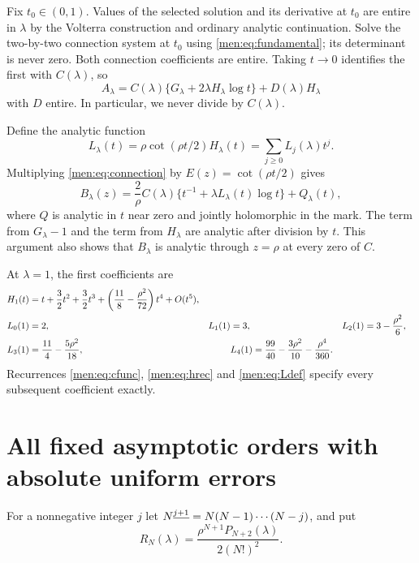 \documentclass[11pt,letterpaper]{article}
\theoremstyle{remark}\newtheorem{remark}[theorem]{Remark}
\begin{document}
Fix $t_0\in(0,1)$. Values of the selected solution and its derivative at $t_0$ are entire in $\lambda$ by the Volterra construction and ordinary analytic continuation. Solve the two-by-two connection system at $t_0$ using \eqref{men:eq:fundamental}; its determinant is never zero. Both connection coefficients are entire. Taking $t\to0$ identifies the first with $C(\lambda)$, so
\begin{equation}\label{men:eq:connection}
 A_\lambda=C(\lambda)\{G_\lambda+2\lambda H_\lambda\log t\}
                   +D(\lambda)H_\lambda
\end{equation}
with $D$ entire. In particular, we never divide by $C(\lambda)$.

Define the analytic function
\begin{equation}\label{men:eq:Ldef}
 L_\lambda(t)=\rho\cot(\rho t/2)H_\lambda(t)
            =\sum_{j\ge0}L_j(\lambda)t^j.
\end{equation}
Multiplying \eqref{men:eq:connection} by $E(z)=\cot(\rho t/2)$ gives
\begin{equation}\label{men:eq:localsingular}
 B_\lambda(z)=\frac2\rho C(\lambda)
     \{t^{-1}+\lambda L_\lambda(t)\log t\}+Q_\lambda(t),
\end{equation}
where $Q$ is analytic in $t$ near zero and jointly holomorphic in the mark. The term from $G_\lambda-1$ and the term from $H_\lambda$ are analytic after division by $t$. This argument also shows that $B_\lambda$ is analytic through $z=\rho$ at every zero of $C$.

At $\lambda=1$, the first coefficients are
\begin{align}
 H_1(t)&=t+\frac32t^2+\frac32t^3+\left(\frac{11}8-\frac{\rho^2}{72}\right)t^4+O(t^5),\notag\\
 L_0(1)&=2,&L_1(1)&=3,&L_2(1)&=3-\frac{\rho^2}6,\label{men:eq:Lfirst}\\
 L_3(1)&=\frac{11}4-\frac{5\rho^2}{18},&&
 L_4(1)=\frac{99}{40}-\frac{3\rho^2}{10}-\frac{\rho^4}{360}.\notag
\end{align}
Recurrences \eqref{men:eq:cfunc}, \eqref{men:eq:hrec} and \eqref{men:eq:Ldef} specify every subsequent coefficient exactly.

\section{All fixed asymptotic orders with absolute uniform errors}\label{men:sec:transfer}
For a nonnegative integer $j$ let $N^{\underline{j+1}}=N(N-1)\cdots(N-j)$, and put
\begin{equation}\label{men:eq:RN}
 R_N(\lambda)=\frac{\rho^{N+1}P_{N+2}(\lambda)}{2(N!)^2}.
\end{equation}
\end{document}
